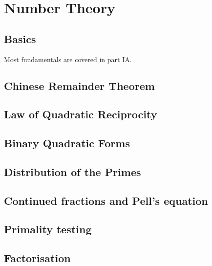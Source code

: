 \documentclass[main.tex]{subfiles}
\begin{document}
\chapter{Number Theory}
	\section{Basics}
		Most fundamentals are covered in part IA.
		
	\section{Chinese Remainder Theorem}
		
	\section{Law of Quadratic Reciprocity}
		
	\section{Binary Quadratic Forms}
		
	\section{Distribution of the Primes}
		
	\section{Continued fractions and Pell's equation}
		
	\section{Primality testing}
		
	\section{Factorisation}		
			
\end{document}
